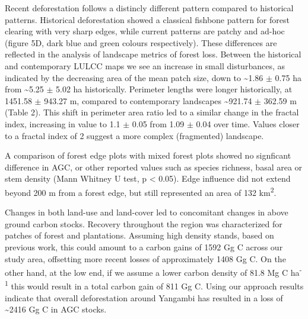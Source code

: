 \documentclass[remote sensing,article,submit,moreauthors,pdftex,10pt,a4paper]{mdpi}
\begin{document}
Recent deforestation follows a distincly different pattern compared to
historical patterns. Historical deforestation showed a classical
fishbone pattern for forest clearing with very sharp edges, while
current patterns are patchy and ad-hoc (figure 5D, dark blue and green
colours respectively). These differences are reflected in the analysis
of landscape metrics of forest loss. Between the historical and
contemporary LULCC maps we see an increase in small disturbances, as
indicated by the decreasing area of the mean patch size, down to
\textasciitilde{}1.86 \(\pm\) 0.75 ha from \textasciitilde{}5.25 \(\pm\)
5.02 ha historically. Perimeter lengths were longer historically, at
1451.58 \(\pm\) 943.27 m, compared to contemporary landscapes
\textasciitilde{}921.74 \(\pm\) 362.59 m (Table 2). This shift in
perimeter area ratio led to a similar change in the fractal index,
increasing in value to 1.1 \(\pm\) 0.05 from 1.09 \(\pm\) 0.04 over
time. Values closer to a fractal index of 2 suggest a more complex
(fragmented) landscape.

A comparison of forest edge plots with mixed forest plots showed no
signficant difference in AGC, or other reported values such as species
richness, basal area or stem density (Mann Whitney U test, p \textless{}
0.05). Edge influence did not extend beyond 200 m from a forest edge,
but still represented an area of 132 km\textsuperscript{2}.

Changes in both land-use and land-cover led to concomitant changes in
above ground carbon stocks. Recovery throughout the region was
characterized for patches of forest and plantations. Assuming high
density stands, based on previous work, this could amount to a carbon
gains of 1592 Gg C across our study area, offsetting more recent losses
of approximately 1408 Gg C. On the other hand, at the low end, if we
assume a lower carbon density of 81.8 Mg C ha\textsuperscript{-1} this
would result in a total carbon gain of 811 Gg C. Using our approach
results indicate that overall deforestation around Yangambi has resulted
in a loss of \textasciitilde{}2416 Gg C in AGC stocks.
\end{document}
